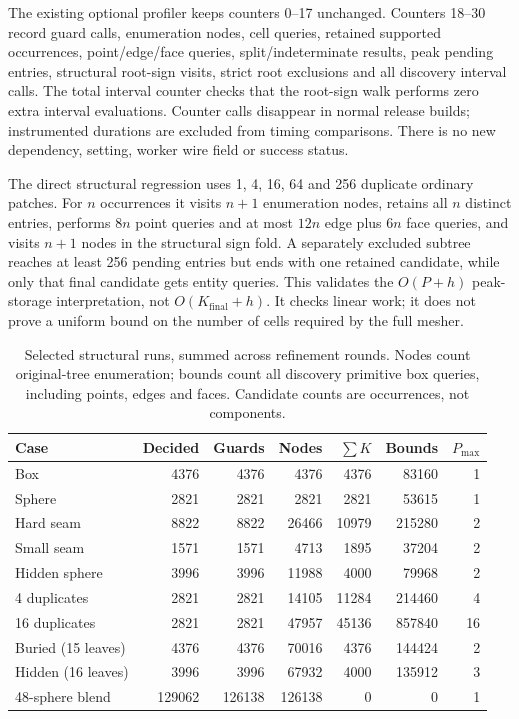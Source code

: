 \documentclass[11pt]{article}
\begin{document}
The existing optional profiler keeps counters 0--17 unchanged. Counters
18--30 record guard calls, enumeration nodes, cell queries, retained supported
occurrences, point/edge/face queries, split/indeterminate results, peak pending
entries, structural root-sign visits, strict root exclusions and all discovery
interval calls. The total interval counter checks that the root-sign walk
performs zero extra interval evaluations. Counter calls disappear in normal
release builds; instrumented durations are excluded from timing comparisons.
There is no new dependency, setting, worker wire field or success status.

The direct structural regression uses 1, 4, 16, 64 and 256 duplicate ordinary
patches. For \(n\) occurrences it visits \(n+1\) enumeration nodes, retains all
\(n\) distinct entries, performs \(8n\) point queries and at most \(12n\) edge
plus \(6n\) face queries, and visits \(n+1\) nodes in the structural sign fold.
A separately excluded subtree reaches at least 256 pending entries but ends
with one retained candidate, while only that final candidate gets entity
queries. This validates the \(O(P+h)\) peak-storage interpretation, not
\(O(K_{\mathrm{final}}+h)\). It checks linear work; it does not prove a uniform
bound on the number of cells required by the full mesher.

\begin{table}[htbp]
\centering\footnotesize
\begin{tabular}{@{}lrrrrrr@{}}
\toprule
Case & Decided & Guards & Nodes & $\sum K$ & Bounds & $P_{\max}$ \\
\midrule
Box & 4376 & 4376 & 4376 & 4376 & 83160 & 1 \\
Sphere & 2821 & 2821 & 2821 & 2821 & 53615 & 1 \\
Hard seam & 8822 & 8822 & 26466 & 10979 & 215280 & 2 \\
Small seam & 1571 & 1571 & 4713 & 1895 & 37204 & 2 \\
Hidden sphere & 3996 & 3996 & 11988 & 4000 & 79968 & 2 \\
4 duplicates & 2821 & 2821 & 14105 & 11284 & 214460 & 4 \\
16 duplicates & 2821 & 2821 & 47957 & 45136 & 857840 & 16 \\
Buried (15 leaves) & 4376 & 4376 & 70016 & 4376 & 144424 & 2 \\
Hidden (16 leaves) & 3996 & 3996 & 67932 & 4000 & 135912 & 3 \\
48-sphere blend & 129062 & 126138 & 126138 & 0 & 0 & 1 \\
\bottomrule
\end{tabular}
\caption{Selected structural runs, summed across refinement rounds. Nodes count original-tree enumeration; bounds count all discovery primitive box queries, including points, edges and faces. Candidate counts are occurrences, not components.}
\label{tab:discovery-work}
\end{table}
\end{document}
